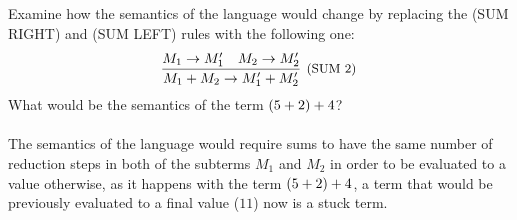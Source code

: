 \subsection{}

Examine how the semantics of the language would change by replacing the
(SUM RIGHT) and (SUM LEFT) rules with the following one:
\[
	\infer[\text{\small{(SUM 2)}}]
	{\SUM{M_1}{M_2} \to \SUM{M_1'}{M_2'}}
	{
		M_1 \to M_1' &
		M_2 \to M_2'
	}
\]
What would be the semantics of the term $(5+2)+4$?\\~\\
The semantics of the language would require sums to have the same number of
reduction steps in both of the subterms $M_1$ and $M_2$ in order to be
evaluated to a value otherwise, as it happens with the term
$(5+2)+4$, a term that would be previously evaluated to a final
value ($11$) now is a stuck term.
